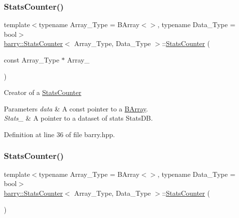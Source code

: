 \subsubsection{\texorpdfstring{Stats\+Counter()}{StatsCounter()}\hspace{0.1cm}{\footnotesize\ttfamily [1/2]}}
{\footnotesize\ttfamily template$<$typename Array\+\_\+\+Type = B\+Array$<$$>$, typename Data\+\_\+\+Type = bool$>$ \\
\hyperlink{classbarry_1_1_stats_counter}{barry\+::\+Stats\+Counter}$<$ Array\+\_\+\+Type, Data\+\_\+\+Type $>$\+::\hyperlink{classbarry_1_1_stats_counter}{Stats\+Counter} (\begin{DoxyParamCaption}\item[{const Array\+\_\+\+Type $\ast$}]{Array\+\_\+ }\end{DoxyParamCaption})\hspace{0.3cm}{\ttfamily [inline]}}



Creator of a {\ttfamily \hyperlink{classbarry_1_1_stats_counter}{Stats\+Counter}} 


\begin{DoxyParams}{Parameters}
{\em data} & A const pointer to a {\ttfamily \hyperlink{classbarry_1_1_b_array}{B\+Array}}. \\
\hline
{\em Stats\+\_\+} & A pointer to a dataset of stats {\ttfamily Stats\+DB}. \\
\hline
\end{DoxyParams}


Definition at line 36 of file barry.\+hpp.

\mbox{\label{classbarry_1_1_stats_counter_a407df1580b207faac92c476c7062b840}} 
\subsubsection{\texorpdfstring{Stats\+Counter()}{StatsCounter()}\hspace{0.1cm}{\footnotesize\ttfamily [2/2]}}
{\footnotesize\ttfamily template$<$typename Array\+\_\+\+Type = B\+Array$<$$>$, typename Data\+\_\+\+Type = bool$>$ \\
\hyperlink{classbarry_1_1_stats_counter}{barry\+::\+Stats\+Counter}$<$ Array\+\_\+\+Type, Data\+\_\+\+Type $>$\+::\hyperlink{classbarry_1_1_stats_counter}{Stats\+Counter} (\begin{DoxyParamCaption}{ }\end{DoxyParamCaption})\hspace{0.3cm}{\ttfamily [inline]}}



